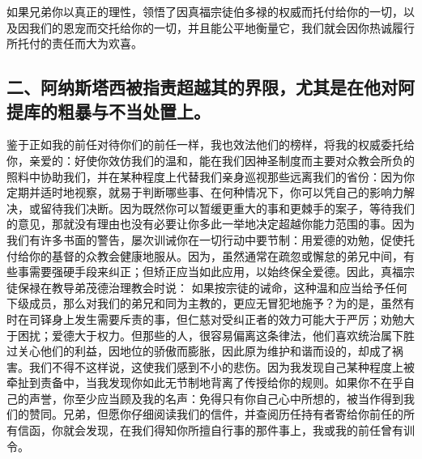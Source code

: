 如果兄弟你以真正的理性，领悟了因真福宗徒伯多禄的权威而托付给你的一切，以及因我们的恩宠而交托给你的一切，并且能公平地衡量它，我们就会因你热诚履行所托付的责任而大为欢喜。\par


\subsection{二、阿纳斯塔西被指责超越其的界限，尤其是在他对阿提库的粗暴与不当处置上。}

鉴于正如我的前任对待你们的前任一样，我也效法他们的榜样，将我的权威委托给你，亲爱的：好使你效仿我们的温和，能在我们因神圣制度而主要对众教会所负的照料中协助我们，并在某种程度上代替我们亲身巡视那些远离我们的省份：因为你定期并适时地视察，就易于判断哪些事、在何种情况下，你可以凭自己的影响力解决，或留待我们决断。因为既然你可以暂缓更重大的事和更棘手的案子，等待我们的意见，那就没有理由也没有必要让你多此一举地决定超越你能力范围的事。因为我们有许多书面的警告，屡次训诫你在一切行动中要节制：用爱德的劝勉，促使托付给你的基督的众教会健康地服从。因为，虽然通常在疏忽或懈怠的弟兄中间，有些事需要强硬手段来纠正；但矫正应当如此应用，以始终保全爱德。因此，真福宗徒保禄在教导弟茂德治理教会时说： 如果按宗徒的诫命，这种温和应当给予任何下级成员，那么对我们的弟兄和同为主教的，更应无冒犯地施予？为的是，虽然有时在司铎身上发生需要斥责的事，但仁慈对受纠正者的效力可能大于严厉；劝勉大于困扰；爱德大于权力。但那些的人，很容易偏离这条律法，他们喜欢统治属下胜过关心他们的利益，因地位的骄傲而膨胀，因此原为维护和谐而设的，却成了祸害。我们不得不这样说，这使我们感到不小的悲伤。因为我发现自己某种程度上被牵扯到责备中，当我发现你如此无节制地背离了传授给你的规则。如果你不在乎自己的声誉，你至少应当顾及我的名声：免得只有你自己心中所想的，被当作得到我们的赞同。兄弟，但愿你仔细阅读我们的信件，并查阅历任持有者寄给你前任的所有信函，你就会发现，在我们得知你所擅自行事的那件事上，我或我的前任曾有训令。\par


